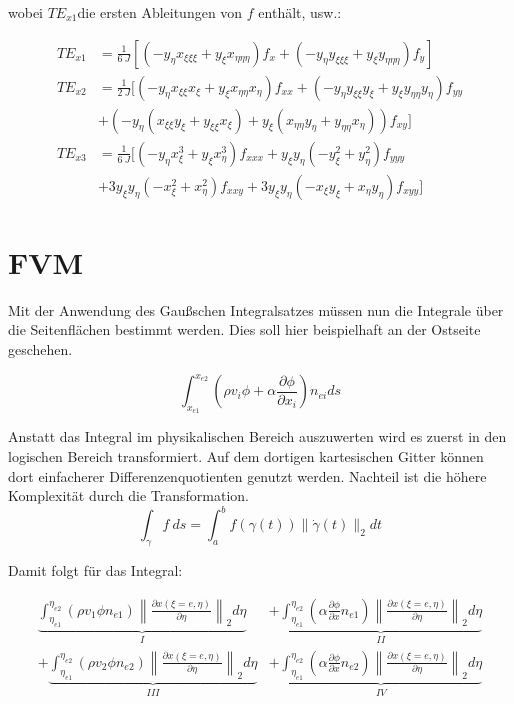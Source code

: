 \documentclass[11pt, ngerman,colorback,accentcolor=tud2d]{tudreport}
\newcommand{\pder}[2][]{\frac{\partial#1}{\partial#2}}
\newcommand{\xxi}{x_{\xi}}
\newcommand{\xxxi}{x_{\xi\xi}}
\newcommand{\xxxxi}{x_{\xi\xi\xi}}
\newcommand{\yxi}{y_{\xi}}
\newcommand{\yxxi}{y_{\xi\xi}}
\newcommand{\yxxxi}{y_{\xi\xi\xi}}
\newcommand{\xeta}{x_{\eta}}
\newcommand{\xeeta}{x_{\eta\eta}}
\newcommand{\xeeeta}{x_{\eta\eta\eta}}
\newcommand{\yeta}{y_{\eta}}
\newcommand{\yeeta}{y_{\eta\eta}}
\newcommand{\yeeeta}{y_{\eta\eta\eta}}
\begin{document}
wobei $TE_{x1}$die ersten Ableitungen von $f$ enthält, usw.:

\begin{align*}
  TE_{x1} &= \frac{1}{6\ J}\left[{
  \left({-\yeta\xxxxi + \yxi\xeeeta}\right) f_x +
  \left({-\yeta\yxxxi + \yxi\yeeeta}\right) f_y
  }\right]\\
  TE_{x2} &= \frac{1}{2\ J} \Big[
  \left({-\yeta\xxxi\xxi + \yxi\xeeta\xeta}\right) f_{xx}+
  \left({-\yeta\yxxi\yxi + \yxi\yeeta\yeta}\right) f_{yy}\\&+
  \left({-\yeta \left({\xxxi\yxi+\yxxi\xxi}\right) +
  \yxi \left({\xeeta\yeta+\yeeta\xeta}\right)}\right) f_{xy}
  \Big]\\
  TE_{x3}&=\frac{1}{6\ J} \Big[
  \left({-\yeta\xxi^3+\yxi\xeta^3}\right) f_{xxx}+
  \yxi \yeta\left({-\yxi^2+\yeta^2}\right) f_{yyy}\\&+
  3 \yxi \yeta \left({-\xxi^2+\xeta^2}\right) f_{xxy}+
  3 \yxi \yeta \left({-\xxi\yxi+\xeta\yeta}\right) f_{xyy}
  \Big]
\end{align*}




\section{FVM}
\label{sec:FVM}

Mit der Anwendung des Gaußschen Integralsatzes müssen nun die Integrale über
die Seitenflächen bestimmt werden. Dies soll hier beispielhaft an der Ostseite geschehen.

\begin{equation}
  \int_{x_{e1}}^{x_{e2}}\left({\rho v_i\phi+\alpha \pder[\phi]{x_i}}\right)n_{ei}ds
\end{equation}

Anstatt das Integral im physikalischen Bereich auszuwerten wird es zuerst in den
logischen Bereich transformiert. Auf dem dortigen kartesischen Gitter können dort einfacherer
Differenzenquotienten genutzt werden. Nachteil ist die höhere Komplexität durch
die Transformation.
\begin{equation}
  \int_{\gamma}f\ ds=\int_a^bf(\gamma (t)) \lVert \dot{\gamma}(t)\rVert_2 dt
\end{equation}

Damit folgt für das Integral:

\begin{align*}
  \underbrace{
  \int_{\eta_{e1}}^{\eta_{e2}} (\rho v_1 \phi n_{e1})
  \left\lVert \frac{\partial x(\xi=e, \eta)}{\partial \eta} \right\rVert_2 d\eta
  }_I
  &+ \underbrace{
  \int_{\eta_{e1}}^{\eta_{e2}} (\alpha \pder[\phi]{x} n_{e1})
  \left\lVert \frac{\partial x(\xi=e, \eta)}{\partial \eta} \right\rVert_2 d\eta
}_{II}\\
  + \underbrace{
  \int_{\eta_{e1}}^{\eta_{e2}} (\rho v_2 \phi n_{e2})
  \left\lVert \frac{\partial x(\xi=e, \eta)}{\partial \eta} \right\rVert_2 d\eta
  }_{III}
  &+ \underbrace{
  \int_{\eta_{e1}}^{\eta_{e2}} (\alpha \pder[\phi]{x} n_{e2})
  \left\lVert \frac{\partial x(\xi=e, \eta)}{\partial \eta} \right\rVert_2 d\eta
  }_{IV}
\end{align*}
\end{document}
